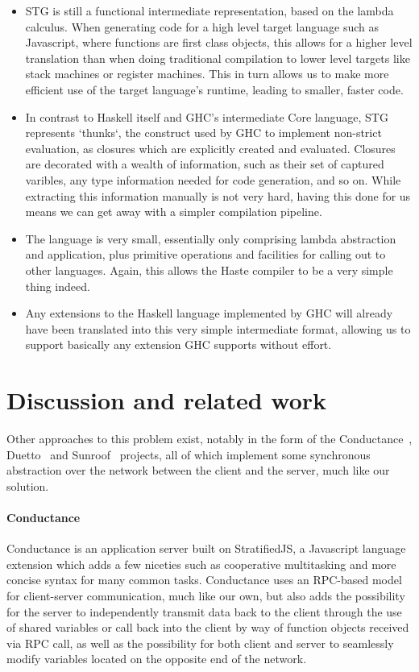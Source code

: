 \documentclass[preprint]{sigplanconf}
\begin{document}
\begin{itemize}
  \item STG is still a functional intermediate representation, based on the
        lambda calculus. When generating code for a high level target language
        such as Javascript, where functions are first class objects, this
        allows for a higher level translation than when doing traditional
        compilation to lower level targets like stack machines or register
        machines. This in turn allows us to make more efficient use of the
        target language's runtime, leading to smaller, faster code.
  \item In contrast to Haskell itself and GHC's intermediate Core language, STG
        represents `thunks`, the construct used by GHC to implement non-strict
        evaluation, as closures which are explicitly created and evaluated.
        Closures are decorated with a wealth of information, such as their set
        of captured varibles, any type information needed for code generation,
        and so on. While extracting this information manually is not very hard,
        having this done for us means we can get away with a simpler
        compilation pipeline.
  \item The language is very small, essentially only comprising lambda
        abstraction and application, plus primitive operations and facilities
        for calling out to other languages. Again, this allows the Haste
        compiler to be a very simple thing indeed.
  \item Any extensions to the Haskell language implemented by GHC will already
        have been translated into this very simple intermediate format,
        allowing us to support basically any extension GHC supports without
        effort.
\end{itemize}

\section{Discussion and related work}

Other approaches to this problem exist, notably in the form of the
Conductance\ \cite{conductance}, Duetto\ \cite{duetto} and
Sunroof\ \cite{sunroof} projects, all of which implement some synchronous
abstraction over the network between the client and the server, much like our
solution.

\paragraph{Conductance} Conductance is an application server built on
StratifiedJS, a Javascript language extension which adds a few niceties such as
cooperative multitasking and more concise syntax for many common tasks.
Conductance uses an RPC-based model for client-server communication, much like
our own, but also adds the possibility for the server to independently transmit
data back to the client through the use of shared variables or call back into
the client by way of function objects received via RPC call, as well as the
possibility for both client and server to seamlessly modify variables located
on the opposite end of the network.
\end{document}
